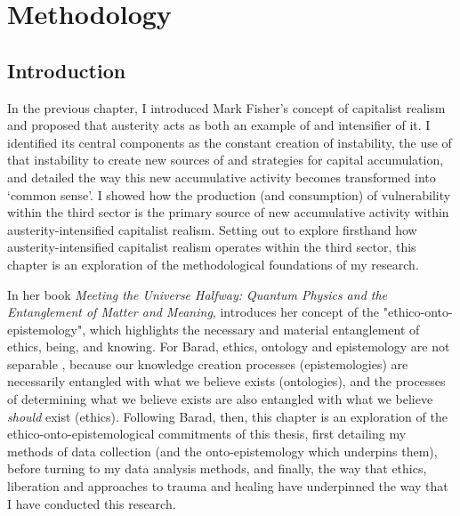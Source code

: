 \chapter{Methodology}
\label{ch:3}
\section{Introduction}
\label{sec:3-1-intro}


In the previous chapter, I introduced Mark Fisher’s concept of capitalist realism and proposed that austerity acts as both an example of and intensifier of it. I identified its central components as the constant creation of instability, the use of that instability to create new sources of and strategies for capital accumulation, and detailed the way this new accumulative activity becomes transformed into `common sense'. I showed how the production (and consumption) of vulnerability within the third sector is the primary source of new accumulative activity within austerity-intensified capitalist realism. Setting out to explore firsthand how austerity-intensified capitalist realism operates within the third sector, this chapter is an exploration of the methodological foundations of my research. 

In her  book \emph{Meeting the Universe Halfway: Quantum Physics and the Entanglement of Matter and Meaning}, \citet[p. 185]{barad_meeting_2007} introduces her concept of the "ethico-onto-epistemology", which highlights the necessary and material entanglement of ethics, being, and knowing. For Barad, ethics, ontology and epistemology are not separable \citep[p. 90]{barad_meeting_2007}, because our knowledge creation processes (epistemologies) are necessarily entangled with what we believe exists (ontologies), and the processes of determining what we believe exists are also entangled with what we believe \textit{should} exist (ethics). Following Barad, then, this chapter is an exploration of the ethico-onto-epistemological commitments of this thesis, first detailing my methods of data collection (and the onto-epistemology which underpins them), before turning to my data analysis methods, and finally, the way that ethics, liberation and approaches to trauma and healing have underpinned the way that I have conducted this research.

